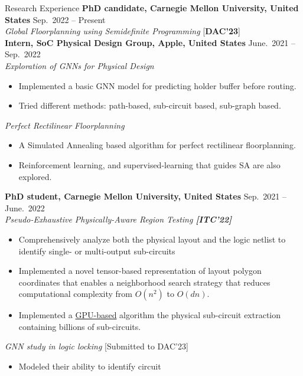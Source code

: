 
\begin{rSection}{Research Experience}
    {\bf PhD candidate, Carnegie Mellon University, United States}               \hfill { Sep.~2022 -- Present} \\
    \textit{Global Floorplanning using Semidefinite Programming} [\textbf{{DAC'23}}] \\
{\bf Intern, SoC Physical Design Group, Apple, United States}               \hfill { June.~2021 -- Sep.~2022} \\
\textit{Exploration of GNNs for Physical Design }
\begin{itemize}[noitemsep,topsep=-5pt]
    \item Implemented a basic GNN model for predicting holder buffer before routing.
    \item Tried different methods: path-based, sub-circuit based, sub-graph based.
\end{itemize}
\textit{Perfect Rectilinear Floorplanning}
\begin{itemize}[noitemsep,topsep=-5pt]
    \item A Simulated Annealing based algorithm for perfect rectilinear floorplanning.
    \item Reinforcement learning, and supervised-learning that guides SA are also explored.
\end{itemize}
{\bf PhD student, Carnegie Mellon University, United States}               \hfill { Sep.~2021 -- June.~2022} \\
\textit{Pseudo-Exhaustive Physically-Aware Region Testing \textbf{[{ITC'22}]}}
\begin{itemize}[noitemsep,topsep=-5pt]
    \item Comprehensively analyze both the physical layout and the logic netlist to identify single- or multi-output sub-circuits
    \item Implemented a novel tensor-based representation of layout polygon coordinates that enables a neighborhood
    search strategy that reduces computational complexity
    from $O(n^2)$ to $O(dn)$.
    \item Implemented a \underline{GPU-based} algorithm the physical sub-circuit extraction containing billions of sub-circuits.
\end{itemize}
\textit{GNN study in logic locking} [{Submitted to DAC'23}]
\begin{itemize}[noitemsep,topsep=-5pt]
    \item Modeled their ability to identify circuit

\end{itemize}
\end{rSection}
